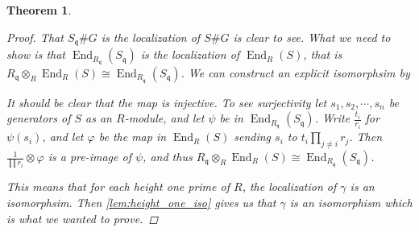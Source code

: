 \documentclass[11pt, a4paper, english]{article}
\numberwithin{prop}{section}
\numberwithin{lemma}{section}
\newtheorem{theorem}{Theorem}
\numberwithin{theorem}{section}
\numberwithin{defin}{section}
\numberwithin{example}{section}
\DeclareMathOperator{\End}{End}
\begin{document}
\begin{theorem}
\begin{proof}
That $S_\mathfrak{q} \# G$ is the localization of $S\#G$ is clear to see. What we need to show is that $\End_{R_\mathfrak{q}}(S_\mathfrak{q})$ is the localization of $\End_R(S)$, that is $R_\mathfrak{q} \otimes_R \End_R(S) \cong \End_{R_\mathfrak{q}}(S_\mathfrak{q})$. We can construct an explicit isomorphsim by
\begin{center}
\end{center}
It should be clear that the map is injective. To see surjectivity let $s_1, s_2, \cdots, s_n$ be generators of $S$ as an $R$-module, and let $\psi$ be in $\End_{R_\mathfrak{q}}(S_\mathfrak{q})$. Write $\frac{t_i}{r_i}$ for $\psi(s_i)$, and let $\varphi$ be the map in $\End_R(S)$ sending $s_i$ to $t_i\prod_{j \neq i} r_j$. Then $\frac{1}{\prod r_i} \otimes \varphi$ is a pre-image of $\psi$, and thus $R_\mathfrak{q} \otimes_R \End_R(S) \cong \End_{R_\mathfrak{q}}(S_\mathfrak{q})$.

This means that for each height one prime of $R$, the localization of $\gamma$ is an isomorphsim. Then \cref{lem:height_one_iso} gives us that $\gamma$ is an isomorphism which is what we wanted to prove.

\iffalse
Firstly let's show that for a prime ideal $\mathfrak{p}$ we have that $S_\mathfrak{p}^G = R_\mathfrak{q}$ where $\mathfrak{q} = R \cap \mathfrak{p}$. Assume $\frac{s}{p} \in S_\mathfrak{p}^G$ is fixed by $G$. Consider the fraction
\begin{align*}
\frac{ \left( \prod_{g \neq 1} p^g \right) s}{\prod_g p^g}
\end{align*}
Since we have just multiplied by $\prod_{g \neq 1} p^g$ in the nominator and the denominator it still equals $\frac{s}{p}$. The bottom is obviously fixed by $g$, but why is it not in $\mathfrak{q}$??? 
{\color{red} How do I know $p^g$ is not in $\mathfrak{p}$ ???? You localize using the complement of the prime ideal right??} Then since the denominator is fixed and the fraction as a whole is fixed this implies that the nominator is fixed as well.

Secondly I want to show that $\End_R(S)_\mathfrak{p} = \End_{R_\mathfrak{q}}(S_\mathfrak{p})$. {\color{red} ???}

From here we just need to wrap everything together. Since $G$ does not contain any pseudoreflections we get from \cref{thm:unramified_pseudoreflections} that the map is an isomoprhism when localizing at any height one prime ideal. Then \cref{lem:height_one_iso} gives us that it's an isomophism {\color{red} need to show depth}.
\fi
\end{proof}
\end{theorem}
\end{document}
